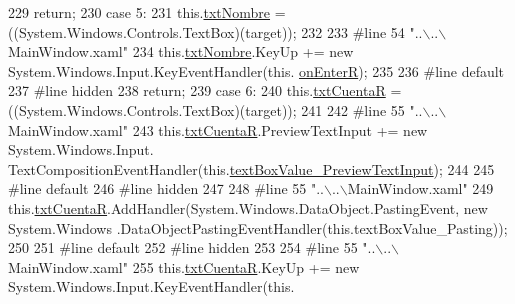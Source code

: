 \begin{DoxyCode}
229 \textcolor{preprocessor}{}            \textcolor{keywordflow}{return};
230             \textcolor{keywordflow}{case} 5:
231             this.\hyperlink{class_asistencias__wpf_1_1_main_window_acd918b065d257146f683ff317be832a6}{txtNombre} = ((System.Windows.Controls.TextBox)(target));
232             
233 \textcolor{preprocessor}{            #line 54 "..\(\backslash\)..\(\backslash\)MainWindow.xaml"}
234 \textcolor{preprocessor}{}            this.\hyperlink{class_asistencias__wpf_1_1_main_window_acd918b065d257146f683ff317be832a6}{txtNombre}.KeyUp += \textcolor{keyword}{new} System.Windows.Input.KeyEventHandler(this.
      \hyperlink{class_asistencias__wpf_1_1_main_window_a021f286d29f89afb7e646c8a02fdcb4b}{onEnterR});
235             
236 \textcolor{preprocessor}{            #line default}
237 \textcolor{preprocessor}{}\textcolor{preprocessor}{            #line hidden}
238 \textcolor{preprocessor}{}            \textcolor{keywordflow}{return};
239             \textcolor{keywordflow}{case} 6:
240             this.\hyperlink{class_asistencias__wpf_1_1_main_window_a4ce5343faaf6dc02bc33f5da846cd4db}{txtCuentaR} = ((System.Windows.Controls.TextBox)(target));
241             
242 \textcolor{preprocessor}{            #line 55 "..\(\backslash\)..\(\backslash\)MainWindow.xaml"}
243 \textcolor{preprocessor}{}            this.\hyperlink{class_asistencias__wpf_1_1_main_window_a4ce5343faaf6dc02bc33f5da846cd4db}{txtCuentaR}.PreviewTextInput += \textcolor{keyword}{new} System.Windows.Input.
      TextCompositionEventHandler(this.\hyperlink{class_asistencias__wpf_1_1_main_window_a952d704cbea0440a9215abf74fe0ab17}{textBoxValue\_PreviewTextInput});
244             
245 \textcolor{preprocessor}{            #line default}
246 \textcolor{preprocessor}{}\textcolor{preprocessor}{            #line hidden}
247 \textcolor{preprocessor}{}            
248 \textcolor{preprocessor}{            #line 55 "..\(\backslash\)..\(\backslash\)MainWindow.xaml"}
249 \textcolor{preprocessor}{}            this.\hyperlink{class_asistencias__wpf_1_1_main_window_a4ce5343faaf6dc02bc33f5da846cd4db}{txtCuentaR}.AddHandler(System.Windows.DataObject.PastingEvent, \textcolor{keyword}{new} System.Windows
      .DataObjectPastingEventHandler(\textcolor{keyword}{this}.textBoxValue\_Pasting));
250             
251 \textcolor{preprocessor}{            #line default}
252 \textcolor{preprocessor}{}\textcolor{preprocessor}{            #line hidden}
253 \textcolor{preprocessor}{}            
254 \textcolor{preprocessor}{            #line 55 "..\(\backslash\)..\(\backslash\)MainWindow.xaml"}
255 \textcolor{preprocessor}{}            this.\hyperlink{class_asistencias__wpf_1_1_main_window_a4ce5343faaf6dc02bc33f5da846cd4db}{txtCuentaR}.KeyUp += \textcolor{keyword}{new} System.Windows.Input.KeyEventHandler(this.

\end{DoxyCode}
